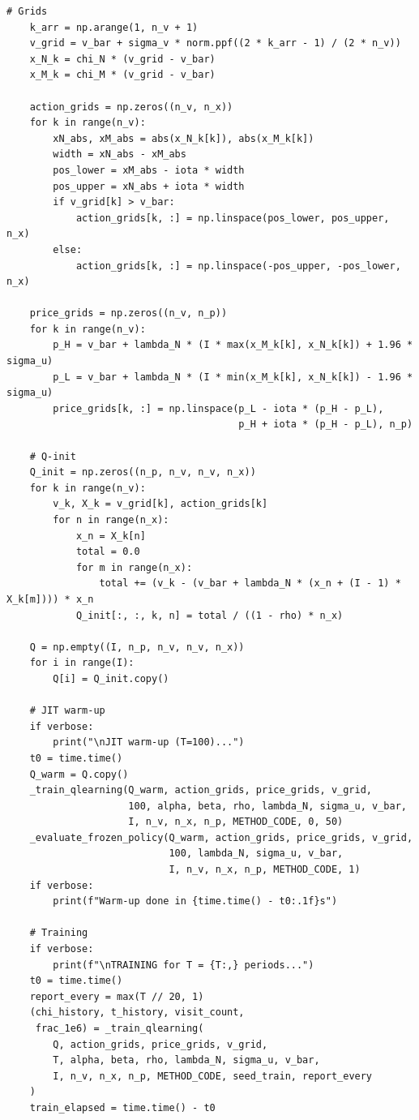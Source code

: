 \begin{lstlisting}[style=pythonstyle]
    # Grids
    k_arr = np.arange(1, n_v + 1)
    v_grid = v_bar + sigma_v * norm.ppf((2 * k_arr - 1) / (2 * n_v))
    x_N_k = chi_N * (v_grid - v_bar)
    x_M_k = chi_M * (v_grid - v_bar)

    action_grids = np.zeros((n_v, n_x))
    for k in range(n_v):
        xN_abs, xM_abs = abs(x_N_k[k]), abs(x_M_k[k])
        width = xN_abs - xM_abs
        pos_lower = xM_abs - iota * width
        pos_upper = xN_abs + iota * width
        if v_grid[k] > v_bar:
            action_grids[k, :] = np.linspace(pos_lower, pos_upper, n_x)
        else:
            action_grids[k, :] = np.linspace(-pos_upper, -pos_lower, n_x)

    price_grids = np.zeros((n_v, n_p))
    for k in range(n_v):
        p_H = v_bar + lambda_N * (I * max(x_M_k[k], x_N_k[k]) + 1.96 * sigma_u)
        p_L = v_bar + lambda_N * (I * min(x_M_k[k], x_N_k[k]) - 1.96 * sigma_u)
        price_grids[k, :] = np.linspace(p_L - iota * (p_H - p_L),
                                        p_H + iota * (p_H - p_L), n_p)

    # Q-init
    Q_init = np.zeros((n_p, n_v, n_v, n_x))
    for k in range(n_v):
        v_k, X_k = v_grid[k], action_grids[k]
        for n in range(n_x):
            x_n = X_k[n]
            total = 0.0
            for m in range(n_x):
                total += (v_k - (v_bar + lambda_N * (x_n + (I - 1) * X_k[m]))) * x_n
            Q_init[:, :, k, n] = total / ((1 - rho) * n_x)

    Q = np.empty((I, n_p, n_v, n_v, n_x))
    for i in range(I):
        Q[i] = Q_init.copy()

    # JIT warm-up
    if verbose:
        print("\nJIT warm-up (T=100)...")
    t0 = time.time()
    Q_warm = Q.copy()
    _train_qlearning(Q_warm, action_grids, price_grids, v_grid,
                     100, alpha, beta, rho, lambda_N, sigma_u, v_bar,
                     I, n_v, n_x, n_p, METHOD_CODE, 0, 50)
    _evaluate_frozen_policy(Q_warm, action_grids, price_grids, v_grid,
                            100, lambda_N, sigma_u, v_bar,
                            I, n_v, n_x, n_p, METHOD_CODE, 1)
    if verbose:
        print(f"Warm-up done in {time.time() - t0:.1f}s")

    # Training
    if verbose:
        print(f"\nTRAINING for T = {T:,} periods...")
    t0 = time.time()
    report_every = max(T // 20, 1)
    (chi_history, t_history, visit_count,
     frac_1e6) = _train_qlearning(
        Q, action_grids, price_grids, v_grid,
        T, alpha, beta, rho, lambda_N, sigma_u, v_bar,
        I, n_v, n_x, n_p, METHOD_CODE, seed_train, report_every
    )
    train_elapsed = time.time() - t0


\end{lstlisting}

